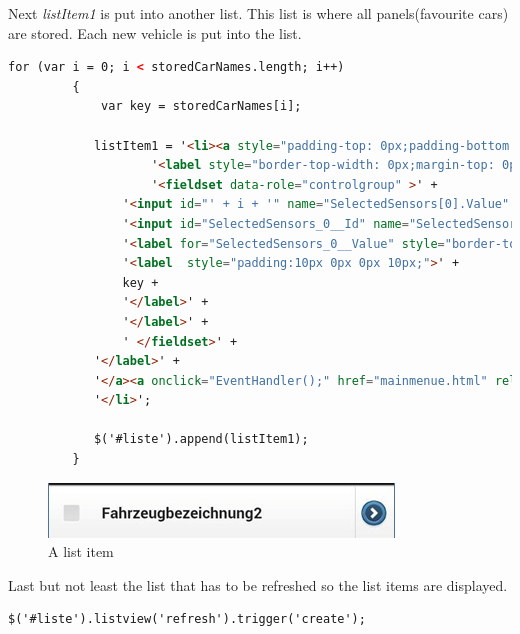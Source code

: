 Next \textit{listItem1} is put into another list. This list is where all panels(favourite cars) are stored. Each new vehicle is put into the list.
\\
\begin{lstlisting}[language=html, caption= 
Adding list items into the list,captionpos=b]
for (var i = 0; i < storedCarNames.length; i++)  
         {
             var key = storedCarNames[i];

            listItem1 = '<li><a style="padding-top: 0px;padding-bottom: 0px;padding-right: 42px;padding-left: 0px;">' +
                    '<label style="border-top-width: 0px;margin-top: 0px;border-bottom-width: 0px;margin-bottom: 0px;border-left-width: 0px;border-right-width: 0px;" data-corners="false">' +
                    '<fieldset data-role="controlgroup" >' +
                '<input id="' + i + '" name="SelectedSensors[0].Value" type="checkbox" value="true" />' +
                '<input id="SelectedSensors_0__Id" name="SelectedSensors[0].Id" type="hidden" value="16" />' +
                '<label for="SelectedSensors_0__Value" style="border-top-width: 0px;margin-top: 0px;border-bottom-width: 0px;margin-bottom: 0px;border-left-width: 0px;border-right-width: 0px;">' +
                '<label  style="padding:10px 0px 0px 10px;">' +
                key +
                '</label>' +
                '</label>' +
                ' </fieldset>' +
            '</label>' +
            '</a><a onclick="EventHandler();" href="mainmenue.html" rel="external"></a>' +
            '</li>';

            $('#liste').append(listItem1);
         }
\end{lstlisting}

\begin{figure}[h]
\centering
\includegraphics[width=0.4\linewidth]{graphics/chapter4/16}
\caption{A list item}
\label{fig:17}
\end{figure}

Last but not least the list that has to be refreshed so the list items are displayed. 
\\

\begin{lstlisting}[language=html, caption= 
Refreshing the list,captionpos=b]
$('#liste').listview('refresh').trigger('create'); 
\end{lstlisting}

